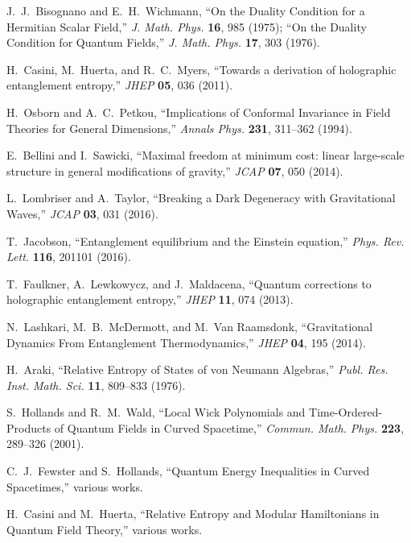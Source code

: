 \documentclass[aps,prd,onecolumn,superscriptaddress,nofootinbib]{revtex4-2}
\begin{document}

\begin{thebibliography}{99}

J.~J.~Bisognano and E.~H.~Wichmann,
``On the Duality Condition for a Hermitian Scalar Field,'' \emph{J. Math. Phys.} \textbf{16}, 985 (1975);
``On the Duality Condition for Quantum Fields,'' \emph{J. Math. Phys.} \textbf{17}, 303 (1976).

H.~Casini, M.~Huerta, and R.~C.~Myers,
``Towards a derivation of holographic entanglement entropy,''
\emph{JHEP} \textbf{05}, 036 (2011).

H.~Osborn and A.~C.~Petkou,
``Implications of Conformal Invariance in Field Theories for General Dimensions,''
\emph{Annals Phys.} \textbf{231}, 311–362 (1994).

E.~Bellini and I.~Sawicki,
``Maximal freedom at minimum cost: linear large-scale structure in general modifications of gravity,''
\emph{JCAP} \textbf{07}, 050 (2014).

L.~Lombriser and A.~Taylor,
``Breaking a Dark Degeneracy with Gravitational Waves,''
\emph{JCAP} \textbf{03}, 031 (2016).

T.~Jacobson,
``Entanglement equilibrium and the Einstein equation,''
\emph{Phys. Rev. Lett.} \textbf{116}, 201101 (2016).

T.~Faulkner, A.~Lewkowycz, and J.~Maldacena,
``Quantum corrections to holographic entanglement entropy,''
\emph{JHEP} \textbf{11}, 074 (2013).

N.~Lashkari, M.~B.~McDermott, and M.~Van Raamsdonk,
``Gravitational Dynamics From Entanglement Thermodynamics,''
\emph{JHEP} \textbf{04}, 195 (2014).

H.~Araki, ``Relative Entropy of States of von Neumann Algebras,''
\emph{Publ. Res. Inst. Math. Sci.} \textbf{11}, 809–833 (1976).

S.~Hollands and R.~M.~Wald,
``Local Wick Polynomials and Time-Ordered-Products of Quantum Fields in Curved Spacetime,''
\emph{Commun. Math. Phys.} \textbf{223}, 289–326 (2001).

C.~J.~Fewster and S.~Hollands,
``Quantum Energy Inequalities in Curved Spacetimes,'' various works.

H.~Casini and M.~Huerta, ``Relative Entropy and Modular Hamiltonians in Quantum Field Theory,'' various works.

\end{thebibliography}
\end{document}
